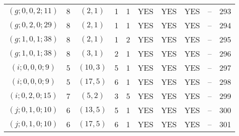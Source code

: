 \begin{longtable}{|c|c|c|c|c|c|c|c|c|c|}
$(g; 0, 0, 2; 11)$ & 8 & $(2, 1)$ & 1 & 1 & YES & YES & YES & -- & 293\\
$(g; 0, 2, 0; 29)$ & 8 & $(2, 1)$ & 1 & 1 & YES & YES & YES & -- & 294\\
$(g; 1, 0, 1; 38)$ & 8 & $(2, 1)$ & 1 & 2 & YES & YES & YES & -- & 295\\
$(g; 1, 0, 1; 38)$ & 8 & $(3, 1)$ & 2 & 1 & YES & YES & YES & -- & 296\\
$(i; 0, 0, 0; 9)$ & 5 & $(10, 3)$ & 5 & 1 & YES & YES & YES & -- & 297\\
$(i; 0, 0, 0; 9)$ & 5 & $(17, 5)$ & 6 & 1 & YES & YES & YES & -- & 298\\
$(i; 0, 2, 0; 15)$ & 7 & $(5, 2)$ & 3 & 5 & YES & YES & YES & -- & 299\\
$(j; 0, 1, 0; 10)$ & 6 & $(13, 5)$ & 5 & 1 & YES & YES & YES & -- & 300\\
$(j; 0, 1, 0; 10)$ & 6 & $(17, 5)$ & 6 & 1 & YES & YES & YES & -- & 301
\end{longtable}
